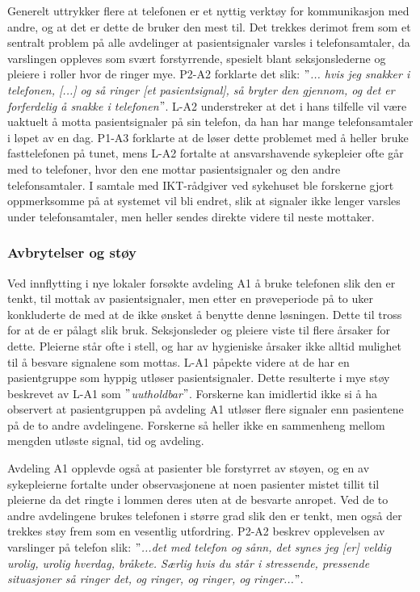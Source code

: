 \noindent
Generelt uttrykker flere at telefonen er et nyttig verktøy for kommunikasjon med andre, og at det er dette de bruker den mest til. Det trekkes derimot frem som et sentralt problem på alle avdelinger at pasientsignaler varsles i telefonsamtaler, da varslingen oppleves som svært forstyrrende, spesielt blant seksjonslederne og pleiere i roller hvor de ringer mye. P2-A2 forklarte det slik: \textit{ $"$... hvis jeg snakker i telefonen, [...] og så ringer [et pasientsignal], så bryter den gjennom, og det er forferdelig å snakke i telefonen$"$}. L-A2 understreker at det i hans tilfelle vil være uaktuelt å motta pasientsignaler på sin telefon, da han har mange telefonsamtaler i løpet av en dag. P1-A3 forklarte at de løser dette problemet med å heller bruke fasttelefonen på tunet, mens L-A2 fortalte at ansvarshavende sykepleier ofte går med to telefoner, hvor den ene mottar pasientsignaler og den andre telefonsamtaler. I samtale med IKT-rådgiver ved sykehuset ble forskerne gjort oppmerksomme på at systemet vil bli endret, slik at signaler ikke lenger varsles under telefonsamtaler, men heller sendes direkte videre til neste mottaker.

\subsubsection{Avbrytelser og støy}
Ved innflytting i nye lokaler forsøkte avdeling A1 å bruke telefonen slik den er tenkt, til mottak av pasientsignaler, men etter en prøveperiode på to uker konkluderte de med at de ikke ønsket å benytte denne løsningen. Dette til tross for at de er pålagt slik bruk. Seksjonsleder og pleiere viste til flere årsaker for dette. Pleierne står ofte i stell, og har av hygieniske årsaker ikke alltid mulighet til å besvare signalene som mottas. L-A1 påpekte videre at de har en pasientgruppe som hyppig utløser pasientsignaler. Dette resulterte i mye støy beskrevet av L-A1 som \textit{$"$uutholdbar$"$}. Forskerne kan imidlertid ikke si å ha observert at pasientgruppen på avdeling A1 utløser flere signaler enn pasientene på de to andre avdelingene. Forskerne så heller ikke en sammenheng mellom mengden utløste signal, tid og avdeling. 

\noindent
Avdeling A1 opplevde også at pasienter ble forstyrret av støyen, og en av sykepleierne fortalte under observasjonene at noen pasienter mistet tillit til pleierne da det ringte i lommen deres uten at de besvarte anropet. Ved de to andre avdelingene brukes telefonen i større grad slik den er tenkt, men også der trekkes støy frem som en vesentlig utfordring. P2-A2 beskrev opplevelsen av varslinger på telefon slik: \textit{ $"$...det med telefon og sånn, det synes jeg [er] veldig urolig, urolig hverdag, bråkete. Særlig hvis du står i stressende, pressende situasjoner så ringer det, og ringer, og ringer, og ringer...$"$}. 

